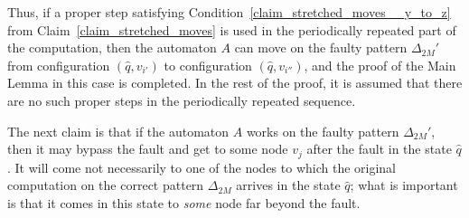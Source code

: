 \documentclass[12pt,a4paper]{article}
\theoremstyle{definition}
\begin{document}
Thus, if a proper step
satisfying Condition~\ref{claim_stretched_moves__y_to_z} from Claim~\ref{claim_stretched_moves}
is used in the periodically repeated part of the computation,
then the automaton $A$ can move on the faulty pattern $\Delta_{2M}'$
from configuration $(\widehat{q},v_{i'})$ to configuration $(\widehat{q},v_{i''})$,
and the proof of the Main Lemma in this case is completed.
In the rest of the proof,
it is assumed that there are no such proper steps in the periodically repeated sequence.

The next claim is that if the automaton $A$
works on the faulty pattern $\Delta_{2M}'$,
then it may bypass the fault and get to some node $v_j$ after the fault
in the state $\widehat{q}$.
It will come not necessarily to one of the nodes
to which the original computation on the correct pattern $\Delta_{2M}$
arrives in the state $\widehat{q}$;
what is important is that it comes in this state
to \emph{some} node far beyond the fault.
\end{document}
